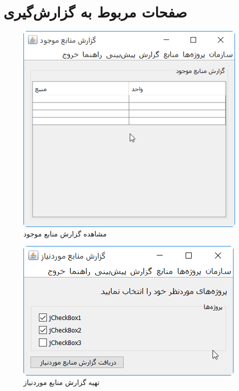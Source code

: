 \section{صفحات مربوط به گزارش‌گیری}
\begin{figure}[H]
	\centering
	\includegraphics[scale=0.8]{img/prot/ViewAvailableResourcesReport}
	\caption{مشاهده گزارش منابع موجود}
\end{figure}
\begin{figure}[H]
	\centering
	\includegraphics[scale=0.8]{img/prot/NeededResourceReport}
	\caption{تهیه گزارش منابع موردنیاز}
\end{figure}

